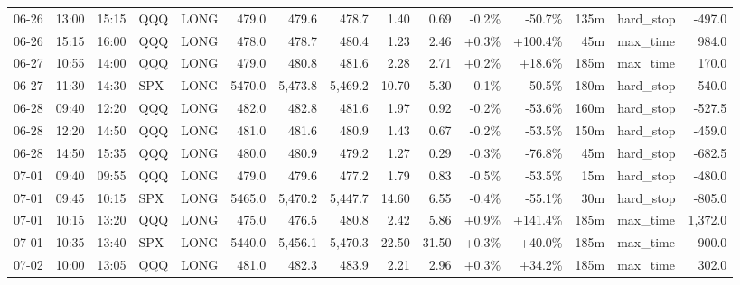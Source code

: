 \documentclass[11pt,a4paper,twoside]{article}
\begin{document}
\begin{landscape}
\begin{center}
\begin{longtable}{>{\color{txtmain}}l l l l l r r r r r r r r >{\color{txtmain}}l r}
06-26 & 13:00 & 15:15 & QQQ & LONG & 479.0 & 479.6 & 478.7 & 1.40 & 0.69 & \textcolor{lossred}{-0.2\%} & \textcolor{lossred}{-50.7\%} & 135m & hard\_stop & \textcolor{lossred}{-497.0} \\
06-26 & 15:15 & 16:00 & QQQ & LONG & 478.0 & 478.7 & 480.4 & 1.23 & 2.46 & \textcolor{wingreen}{+0.3\%} & \textcolor{wingreen}{+100.4\%} & 45m & max\_time & \textcolor{wingreen}{984.0} \\
06-27 & 10:55 & 14:00 & QQQ & LONG & 479.0 & 480.8 & 481.6 & 2.28 & 2.71 & \textcolor{wingreen}{+0.2\%} & \textcolor{wingreen}{+18.6\%} & 185m & max\_time & \textcolor{wingreen}{170.0} \\
06-27 & 11:30 & 14:30 & SPX & LONG & 5470.0 & 5,473.8 & 5,469.2 & 10.70 & 5.30 & \textcolor{lossred}{-0.1\%} & \textcolor{lossred}{-50.5\%} & 180m & hard\_stop & \textcolor{lossred}{-540.0} \\
06-28 & 09:40 & 12:20 & QQQ & LONG & 482.0 & 482.8 & 481.6 & 1.97 & 0.92 & \textcolor{lossred}{-0.2\%} & \textcolor{lossred}{-53.6\%} & 160m & hard\_stop & \textcolor{lossred}{-527.5} \\
06-28 & 12:20 & 14:50 & QQQ & LONG & 481.0 & 481.6 & 480.9 & 1.43 & 0.67 & \textcolor{lossred}{-0.2\%} & \textcolor{lossred}{-53.5\%} & 150m & hard\_stop & \textcolor{lossred}{-459.0} \\
06-28 & 14:50 & 15:35 & QQQ & LONG & 480.0 & 480.9 & 479.2 & 1.27 & 0.29 & \textcolor{lossred}{-0.3\%} & \textcolor{lossred}{-76.8\%} & 45m & hard\_stop & \textcolor{lossred}{-682.5} \\
07-01 & 09:40 & 09:55 & QQQ & LONG & 479.0 & 479.6 & 477.2 & 1.79 & 0.83 & \textcolor{lossred}{-0.5\%} & \textcolor{lossred}{-53.5\%} & 15m & hard\_stop & \textcolor{lossred}{-480.0} \\
07-01 & 09:45 & 10:15 & SPX & LONG & 5465.0 & 5,470.2 & 5,447.7 & 14.60 & 6.55 & \textcolor{lossred}{-0.4\%} & \textcolor{lossred}{-55.1\%} & 30m & hard\_stop & \textcolor{lossred}{-805.0} \\
07-01 & 10:15 & 13:20 & QQQ & LONG & 475.0 & 476.5 & 480.8 & 2.42 & 5.86 & \textcolor{wingreen}{+0.9\%} & \textcolor{wingreen}{+141.4\%} & 185m & max\_time & \textcolor{wingreen}{1,372.0} \\
07-01 & 10:35 & 13:40 & SPX & LONG & 5440.0 & 5,456.1 & 5,470.3 & 22.50 & 31.50 & \textcolor{wingreen}{+0.3\%} & \textcolor{wingreen}{+40.0\%} & 185m & max\_time & \textcolor{wingreen}{900.0} \\
07-02 & 10:00 & 13:05 & QQQ & LONG & 481.0 & 482.3 & 483.9 & 2.21 & 2.96 & \textcolor{wingreen}{+0.3\%} & \textcolor{wingreen}{+34.2\%} & 185m & max\_time & \textcolor{wingreen}{302.0} \\

\end{longtable}
\end{center}
\end{landscape}
\end{document}
